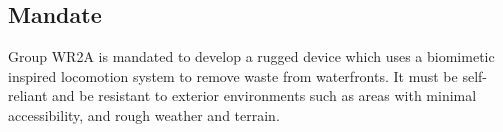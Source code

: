 \subsection{Mandate}

Group WR2A is mandated to develop a rugged device which uses a biomimetic inspired locomotion system to remove waste from waterfronts. It must be self-reliant and be resistant to exterior environments such as areas with minimal accessibility, and rough weather and terrain.
